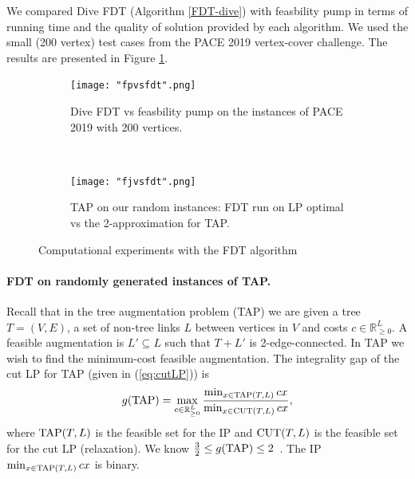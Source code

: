We compared Dive FDT (Algorithm \ref{FDT-dive}) with feasbility pump \cite{fp1} in terms of running time
and the quality of solution provided by each algorithm. We used the small (200 vertex) test cases from the PACE 2019 vertex-cover challenge. The results are presented in Figure \ref{fpvsfdt}. 

\begin{figure}[h!]
\begin{subfigure}{.5\textwidth}
\centering
	\texttt{[image: "fpvsfdt".png]}
	\caption{Dive FDT vs feasbility pump on the instances of PACE 2019 \cite{PACE} with 200 vertices.}
	\label{fpvsfdt}
	\end{subfigure}
	$\quad\;$
	\begin{subfigure}{.5\textwidth}
	\centering
	\texttt{[image: "fjvsfdt".png]}
	\caption{TAP on our random instances: FDT run on LP optimal vs the 2-approximation for TAP\cite{FJ81}.}
	\label{fjvsfdt}
	\end{subfigure}
	\caption{Computational experiments with the FDT algorithm}
	\label{fdtcomp}
\end{figure}
\paragraph{FDT on randomly generated instances of TAP.}
Recall that in the tree augmentation problem (TAP) we are given a tree $T=(V,E)$, a set of non-tree links $L$ between vertices in $V$ and costs $c\in \mathbb{R}^{L}_{\geq 0}$. A feasible augmentation is $L'\subseteq L$ such that $T+L'$ is 2-edge-connected. In TAP we wish to find the minimum-cost feasible augmentation. The integrality gap of the cut LP for TAP (given in (\ref{eq:cutLP})) is
\begin{equation*}
g(\operatorname{{{TAP}}}) = \max_{c\in \mathbb{R}^L_{\geq 0}} \frac{\min_{x\in\operatorname{{{TAP}}}(T,L)} cx}{\min_{x\in\operatorname{{{CUT}}}(T,L)} cx},
\end{equation*}  
where $\operatorname{{{TAP}}}(T,L)$ is the feasible set for the IP and $\operatorname{{{CUT}}}(T,L)$ is the feasible set for the cut LP (relaxation).
We know $\frac{3}{2}\leq g(\operatorname{{{TAP}}})\leq 2$~\cite{FJ81,32gaptap}. The IP $\min_{x\in \operatorname{{{TAP}}}(T,L)}cx$ is binary. 

